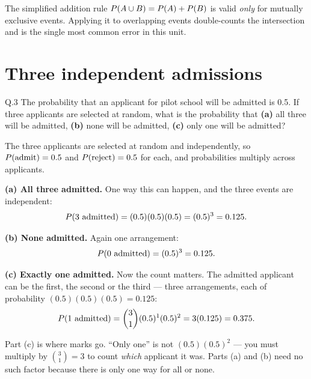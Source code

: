 \begin{pitfall}
The simplified addition rule $P\!\left(A\cup B\right)=P\!\left(A\right)+P\!\left(B\right)$ is valid
\emph{only} for mutually exclusive events. Applying it to overlapping events
double-counts the intersection and is the single most common error in this unit.
\end{pitfall}

\section{Three independent admissions}

\begin{question}{Q.3}
The probability that an applicant for pilot school will be admitted is 0.5.
If three applicants are selected at random, what is the probability that
\textbf{(a)} all three will be admitted, \textbf{(b)} none will be admitted,
\textbf{(c)} only one will be admitted?
\end{question}

\begin{solution}
The three applicants are selected at random and independently, so
$P\!\left(\text{admit}\right)=0.5$ and $P\!\left(\text{reject}\right)=0.5$ for each, and
probabilities multiply across applicants.

\medskip
\textbf{(a) All three admitted.} One way this can happen, and the three events
are independent:
\[
P\!\left(3\text{ admitted}\right)=(0.5)(0.5)(0.5)=(0.5)^{3}=0.125 .
\]

\textbf{(b) None admitted.} Again one arrangement:
\[
P\!\left(0\text{ admitted}\right)=(0.5)^{3}=0.125 .
\]

\textbf{(c) Exactly one admitted.} Now the count matters. The admitted
applicant can be the first, the second or the third --- three arrangements, each
of probability $(0.5)(0.5)(0.5)=0.125$:
\[
P\!\left(1\text{ admitted}\right)=\binom{3}{1}(0.5)^{1}(0.5)^{2}=3(0.125)=0.375 .
\]


\end{solution}

\begin{pitfall}
Part (c) is where marks go. ``Only one'' is not $(0.5)(0.5)^{2}$ --- you must
multiply by $\binom{3}{1}=3$ to count \emph{which} applicant it was. Parts (a)
and (b) need no such factor because there is only one way for all or none.
\end{pitfall}

